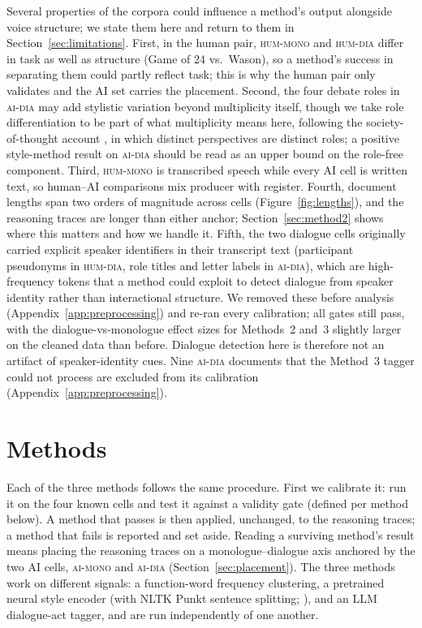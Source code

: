 \documentclass[11pt]{article}
\newcommand{\cellhm}{\textsc{hum-mono}}
\newcommand{\cellhd}{\textsc{hum-dia}}
\newcommand{\cellad}{\textsc{ai-dia}}
\newcommand{\cellam}{\textsc{ai-mono}}
\begin{document}
Several properties of the corpora could influence a method's output alongside
voice structure; we state them here and return to them in
Section~\ref{sec:limitations}. First, in the human pair, \cellhm{} and
\cellhd{} differ in task as well as structure (Game of 24 vs.\ Wason), so a
method's success in separating them could partly reflect task; this is why the
human pair only validates and the AI set carries the placement. Second, the
four debate roles in \cellad{} may add stylistic variation beyond
multiplicity itself, though we take role differentiation to be part of what
multiplicity means here, following the society-of-thought account
\citep{kim2026societies}, in which distinct perspectives are distinct roles;
a positive style-method result on \cellad{} should be read as an upper bound
on the role-free component. Third, \cellhm{} is transcribed speech while every
AI cell is written text, so human--AI comparisons mix producer with register.
Fourth, document lengths span two orders of magnitude across cells
(Figure~\ref{fig:lengths}), and the reasoning traces are longer than either
anchor; Section~\ref{sec:method2} shows where this matters and how we handle
it. Fifth, the two dialogue cells originally carried explicit speaker
identifiers in their transcript text (participant pseudonyms in \cellhd{},
role titles and letter labels in \cellad{}), which are high-frequency tokens
that a method could exploit to detect dialogue from speaker identity rather
than interactional structure. We removed these before analysis
(Appendix~\ref{app:preprocessing}) and re-ran every calibration; all gates
still pass, with the dialogue-vs-monologue effect sizes for Methods~2 and~3
slightly larger on the cleaned data than before. Dialogue detection here is
therefore not an artifact of speaker-identity cues. Nine \cellad{} documents
that the Method~3 tagger could not process are excluded from its calibration
(Appendix~\ref{app:preprocessing}).

\section{Methods}
\label{sec:methods}

Each of the three methods follows the same procedure. First we calibrate it:
run it on the four known cells and test it against a validity gate (defined
per method below). A method that passes is then applied, unchanged, to the
reasoning traces; a method that fails is reported and set aside. Reading a
surviving method's result means placing the reasoning traces on a
monologue--dialogue axis anchored by the two AI cells, \cellam{} and
\cellad{} (Section~\ref{sec:placement}). The three methods work on different
signals: a function-word frequency clustering, a pretrained neural style
encoder (with NLTK Punkt sentence splitting; \citealp{bird2009nltk}), and an
LLM dialogue-act tagger, and are run independently of one another.
\end{document}
